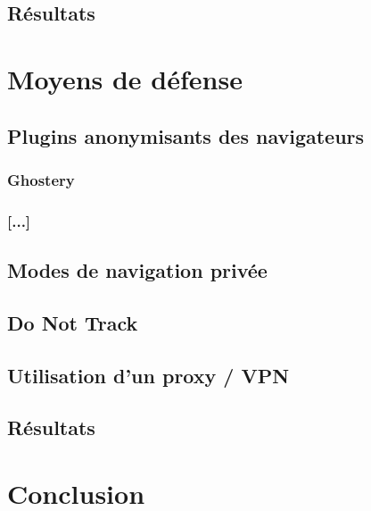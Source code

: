 \documentclass[a4paper,12pt,french]{report}
\begin{document}
\section{Résultats}


\chapter{Moyens de défense}
	\section{Plugins anonymisants des navigateurs}
		\subsection{Ghostery}
		\subsection{[...]}
		
	\section{Modes de navigation privée}
		
	\section{Do Not Track}
		
	\section{Utilisation d'un proxy / VPN}
		
	\section{Résultats}
		


\chapter{Conclusion}
\end{document}
